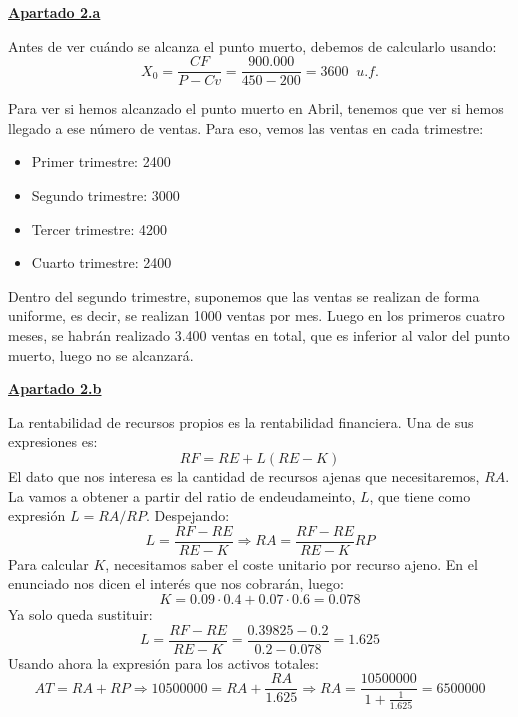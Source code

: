 \documentclass[11pt]{article}
\theoremstyle{definition}
\theoremstyle{remark}
\begin{document}
\medskip

\underline{\textbf{Apartado 2.a}}

Antes de ver cuándo se alcanza el punto muerto, debemos de calcularlo usando:
\[
X_0=\frac{CF}{P-Cv}=\frac{900.000}{450-200}=3600 \;\;u.f.
\]

Para ver si hemos alcanzado el punto muerto en Abril, tenemos que ver si hemos llegado a ese número de ventas. Para eso, vemos las ventas en cada trimestre:
\begin{itemize}
\item Primer trimestre: 2400
\item Segundo trimestre: 3000
\item Tercer trimestre: 4200
\item Cuarto trimestre: 2400
\end{itemize}
Dentro del segundo trimestre, suponemos que las ventas se realizan de forma uniforme, es decir, se realizan 1000 ventas por mes. Luego en los primeros cuatro meses, se habrán realizado 3.400 ventas en total, que es inferior al valor del punto muerto, luego no se alcanzará.

\underline{\textbf{Apartado 2.b}}

La rentabilidad de recursos propios es la rentabilidad financiera. Una de sus expresiones es:
\[
RF=RE+L(RE-K)
\]
El dato que nos interesa es la cantidad de recursos ajenas que necesitaremos, $RA$. La vamos a obtener a partir del ratio de endeudameinto, $L$, que tiene como expresión $L=RA/RP$. Despejando:
\[
L=\frac{RF-RE}{RE-K} \Rightarrow RA=\frac{RF-RE}{RE-K}RP
\]
Para calcular $K$, necesitamos saber el coste unitario por recurso ajeno. En el enunciado nos dicen el interés que nos cobrarán, luego:
\[
K=0.09\cdot0.4+0.07\cdot 0.6=0.078
\]
Ya solo queda sustituir:
\[
L=\frac{RF-RE}{RE-K}=\frac{0.39825-0.2}{0.2-0.078}=1.625
\]
Usando ahora la expresión para los activos totales:
\[
AT=RA+RP \Rightarrow 10500000=RA+\frac{RA}{1.625} \Rightarrow RA=\frac{10500000}{1+\frac{1}{1.625}}=6500000
\]
\end{document}
